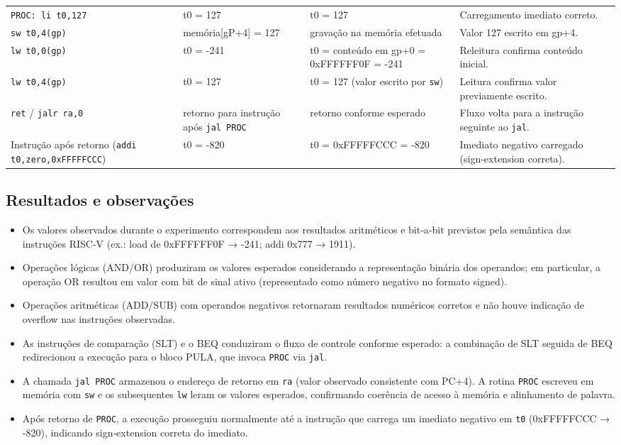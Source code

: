 \documentclass[12pt,a4paper]{article}
\begin{document}
\begin{longtable}{p{4.5cm} p{3.2cm} p{3.2cm} p{5.5cm}}
\lstinline|PROC: li t0,127| & t0 = 127 & t0 = 127 & Carregamento imediato correto. \\

\lstinline|sw t0,4(gp)| & memória[gP+4] = 127 & gravação na memória efetuada & Valor 127 escrito em gp+4. \\

\lstinline|lw t0,0(gp)| & t0 = -241 & t0 = conteúdo em gp+0 = 0xFFFFFF0F = -241 & Releitura confirma conteúdo inicial. \\

\lstinline|lw t0,4(gp)| & t0 = 127 & t0 = 127 (valor escrito por \lstinline|sw|) & Leitura confirma valor previamente escrito. \\

\lstinline|ret| / \lstinline|jalr ra,0| & retorno para instrução após \lstinline|jal PROC| & retorno conforme esperado & Fluxo volta para a instrução seguinte ao \texttt{jal}. \\

Instrução após retorno (\lstinline|addi t0,zero,0xFFFFFCCC|) & t0 = -820 & t0 = 0xFFFFFCCC = -820 & Imediato negativo carregado (sign‑extension correta). \\

\bottomrule
\end{longtable}

\subsection*{Resultados e observações}
\begin{itemize}
    \item Os valores observados durante o experimento correspondem aos resultados aritméticos e bit‑a‑bit previstos pela semântica das instruções RISC‑V (ex.: load de 0xFFFFFF0F → -241; addi 0x777 → 1911).
    \item Operações lógicas (AND/OR) produziram os valores esperados considerando a representação binária dos operandos; em particular, a operação OR resultou em valor com bit de sinal ativo (representado como número negativo no formato signed). 
    \item Operações aritméticas (ADD/SUB) com operandos negativos retornaram resultados numéricos corretos e não houve indicação de overflow nas instruções observadas.
    \item As instruções de comparação (SLT) e o BEQ conduziram o fluxo de controle conforme esperado: a combinação de SLT seguida de BEQ redirecionou a execução para o bloco PULA, que invoca \texttt{PROC} via \texttt{jal}.
    \item A chamada \texttt{jal PROC} armazenou o endereço de retorno em \texttt{ra} (valor observado consistente com PC+4). A rotina \texttt{PROC} escreveu em memória com \texttt{sw} e os subsequentes \texttt{lw} leram os valores esperados, confirmando coerência de acesso à memória e alinhamento de palavra.
    \item Após retorno de \texttt{PROC}, a execução prosseguiu normalmente até a instrução que carrega um imediato negativo em \texttt{t0} (0xFFFFFCCC → -820), indicando sign‑extension correta do imediato.
\end{itemize}
\end{document}
